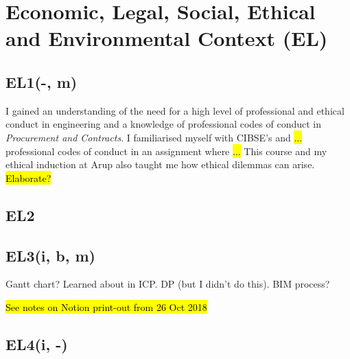 
\section{Economic, Legal, Social, Ethical and Environmental Context (EL)}

\subsection*{EL1(-, m)}

I gained an understanding of the need for a high level of professional and ethical conduct in engineering and a knowledge of professional codes of conduct in \textit{Procurement and Contracts}.
I familiarised myself with CIBSE's and \hl{...} professional codes of conduct in an assignment where \hl{...}
This course and my ethical induction at Arup also taught me how ethical dilemmas can arise.
\hl{Elaborate?}





\subsection*{EL2}





\subsection*{EL3(i, b, m)}

Gantt chart? Learned about in ICP.
DP (but I didn't do this).
BIM process?

\hl{See notes on Notion print-out from 26 Oct 2018}


\subsection*{EL4(i, -)}

